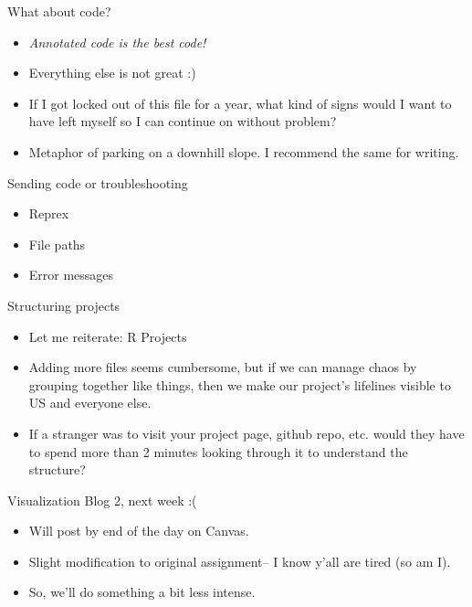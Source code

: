 \documentclass[
  ignorenonframetext,
]{beamer}
\begin{document}
\begin{frame}{What about code?}
\protect\hypertarget{what-about-code}{}
\begin{itemize}
\item
  \emph{Annotated code is the best code!}
\item
  Everything else is not great :)
\item
  If I got locked out of this file for a year, what kind of signs would
  I want to have left myself so I can continue on without problem?
\item
  Metaphor of parking on a downhill slope. I recommend the same for
  writing.
\end{itemize}
\end{frame}

\begin{frame}{Sending code or troubleshooting}
\protect\hypertarget{sending-code-or-troubleshooting}{}
\begin{itemize}
\item
  Reprex
\item
  File paths
\item
  Error messages
\end{itemize}
\end{frame}

\begin{frame}{Structuring projects}
\protect\hypertarget{structuring-projects}{}
\begin{itemize}
\item
  Let me reiterate: R Projects
\item
  Adding more files seems cumbersome, but if we can manage chaos by
  grouping together like things, then we make our project's lifelines
  visible to US and everyone else.
\item
  If a stranger was to visit your project page, github repo, etc. would
  they have to spend more than 2 minutes looking through it to
  understand the structure?
\end{itemize}
\end{frame}

\begin{frame}{Visualization Blog 2, next week :(}
\protect\hypertarget{visualization-blog-2-next-week}{}
\begin{itemize}
\item
  Will post by end of the day on Canvas.
\item
  Slight modification to original assignment-- I know y'all are tired
  (so am I).
\item
  So, we'll do something a bit less intense.
\end{itemize}
\end{frame}
\end{document}
